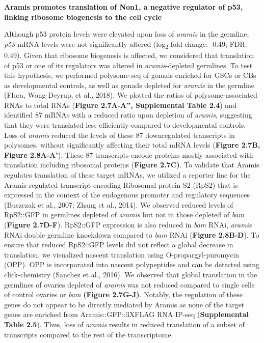 \documentclass[12pt,oneside]{reedthesis}
\begin{document}
\textbf{Aramis promotes translation of Non1, a negative regulator of p53,
linking ribosome biogenesis to the cell cycle}

Although p53 protein levels were elevated upon loss of \emph{aramis} in the
germline, \emph{p53} mRNA levels were not significantly altered (log\textsubscript{2} fold
change: -0.49; FDR: 0.49). Given that ribosome biogenesis is affected,
we considered that translation of p53 or one of its regulators was
altered in \emph{aramis}-depleted germlines. To test this hypothesis, we
performed polysome-seq of gonads enriched for GSCs or CBs as
developmental controls, as well as gonads depleted for \emph{aramis} in the
germline (Flora, Wong-Deyrup, et al., 2018). We plotted the ratios of polysome-associated
RNAs to total RNAs (\textbf{Figure 2.7A-A'', Supplemental Table 2.4}) and
identified 87 mRNAs with a reduced ratio upon depletion of \emph{aramis},
suggesting that they were translated less efficiently compared to
developmental controls. Loss of \emph{aramis} reduced the levels of these 87
downregulated transcripts in polysomes, without significantly affecting
their total mRNA levels (\textbf{Figure 2.7B, Figure 2.8A-A'}). These 87
transcripts encode proteins mostly associated with translation including
ribosomal proteins (\textbf{Figure 2.7C)}. To validate that Aramis regulates
translation of these target mRNAs, we utilized a reporter line for the
Aramis-regulated transcript encoding Ribosomal protein S2 (RpS2) that is
expressed in the context of the endogenous promoter and regulatory
sequences (Buszczak et al., 2007; Zhang et al., 2014). We
observed reduced levels of RpS2::GFP in germlines depleted of \emph{aramis}
but not in those depleted of \emph{bam} (\textbf{Figure 2.7D-F}). RpS2::GFP
expression is also reduced in \emph{bam} RNAi, \emph{aramis} RNAi double germline
knockdown compared to \emph{bam} RNAi (\textbf{Figure 2.8B-D}). To ensure that
reduced RpS2::GFP levels did not reflect a global decrease in
translation, we visualized nascent translation using
O-propargyl-puromycin (OPP). OPP is incorporated into nascent
polypeptides and can be detected using click-chemistry
(Sanchez et al., 2016). We observed that global translation in the germlines
of ovaries depleted of \emph{aramis} was not reduced compared to single cells
of control ovaries or \emph{bam} \textbf{(Figure 2.7G-J)}. Notably, the regulation
of these genes do not appear to be directly mediated by Aramis as none
of the target genes are enriched from Aramis::GFP::3XFLAG RNA IP-seq
(\textbf{Supplemental Table 2.5}). Thus, loss of \emph{aramis} results in reduced
translation of a subset of transcripts compared to the rest of the
transcriptome.
\end{document}
